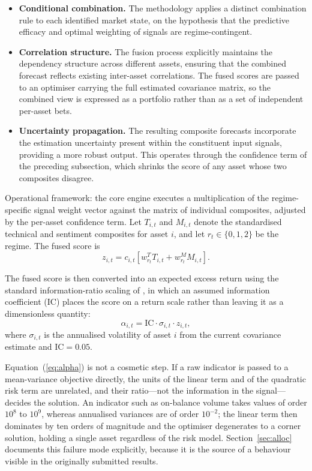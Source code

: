 \begin{itemize}
\item \textbf{Conditional combination.} The methodology applies a distinct combination
rule to each identified market state, on the hypothesis that the predictive efficacy and
optimal weighting of signals are regime-contingent.
\item \textbf{Correlation structure.} The fusion process explicitly maintains the
dependency structure across different assets, ensuring that the combined forecast reflects
existing inter-asset correlations. The fused scores are passed to an optimiser carrying
the full estimated covariance matrix, so the combined view is expressed as a portfolio
rather than as a set of independent per-asset bets.
\item \textbf{Uncertainty propagation.} The resulting composite forecasts incorporate the
estimation uncertainty present within the constituent input signals, providing a more
robust output. This operates through the confidence term of the preceding subsection,
which shrinks the score of any asset whose two composites disagree.
\end{itemize}

Operational framework: the core engine executes a multiplication of the regime-specific
signal weight vector against the matrix of individual composites, adjusted by the
per-asset confidence term. Let $T_{i,t}$ and $M_{i,t}$ denote the standardised technical
and sentiment composites for asset $i$, and let $r_t \in \{0,1,2\}$ be the regime. The
fused score is
\begin{equation}
z_{i,t} = c_{i,t} \left[ w^{T}_{r_t} T_{i,t} + w^{M}_{r_t} M_{i,t} \right].
\end{equation}

The fused score is then converted into an expected excess return using the standard
information-ratio scaling of \citet{grinold00}, in which an assumed information
coefficient (IC) places the score on a return scale rather than leaving it as a
dimensionless quantity:
\begin{equation}
\alpha_{i,t} = \mathrm{IC} \cdot \sigma_{i,t} \cdot z_{i,t},
\label{eq:alpha}
\end{equation}
where $\sigma_{i,t}$ is the annualised volatility of asset $i$ from the current
covariance estimate and $\mathrm{IC} = 0.05$.

Equation~(\ref{eq:alpha}) is not a cosmetic step. If a raw indicator is passed to a
mean-variance objective directly, the units of the linear term and of the quadratic risk
term are unrelated, and their ratio---not the information in the signal---decides the
solution. An indicator such as on-balance volume takes values of order $10^{8}$ to
$10^{9}$, whereas annualised variances are of order $10^{-2}$; the linear term then
dominates by ten orders of magnitude and the optimiser degenerates to a corner solution,
holding a single asset regardless of the risk model. Section~\ref{sec:alloc} documents
this failure mode explicitly, because it is the source of a behaviour visible in the
originally submitted results.

